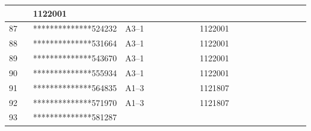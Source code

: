 \documentclass[UTF8,10pt,a4paper,fontset=fandol]{ctexart}
\newcommand{\fieldvalue}[1]{#1}
\begin{document}
\begin{center}
\begin{tabular}{|p{0.08\linewidth}|p{0.30\linewidth}|p{0.25\linewidth}|p{0.22\linewidth}|p{0.15\linewidth}|}
&
\fieldvalue{1122001}
& \\ \hline
\fieldvalue{87}
&
\fieldvalue{**************524232}
&
\fieldvalue{A3--1}
&
\fieldvalue{1122001}
& \\ \hline
\fieldvalue{88}
&
\fieldvalue{**************531664}
&
\fieldvalue{A3--1}
&
\fieldvalue{1122001}
& \\ \hline
\fieldvalue{89}
&
\fieldvalue{**************543670}
&
\fieldvalue{A3--1}
&
\fieldvalue{1122001}
& \\ \hline
\fieldvalue{90}
&
\fieldvalue{**************555934}
&
\fieldvalue{A3--1}
&
\fieldvalue{1122001}
& \\ \hline
\fieldvalue{91}
&
\fieldvalue{**************564835}
&
\fieldvalue{A1--3}
&
\fieldvalue{1121807}
& \\ \hline
\fieldvalue{92}
&
\fieldvalue{**************571970}
&
\fieldvalue{A1--3}
&
\fieldvalue{1121807}
& \\ \hline
\fieldvalue{93}
&
\fieldvalue{**************581287}
&

\end{tabular}
\end{center}
\end{document}
